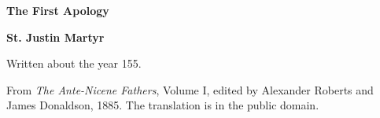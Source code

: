 \documentclass[11pt,letterpaper]{article}
\begin{document}
\color{ink}

\begin{titlepage}
\centering
\vspace*{4em}
{\LARGE\bfseries\color{heading} The First Apology\par}
\vspace{2em}
{\LARGE\bfseries\color{heading} St. Justin Martyr\par}
\vspace{3em}
{Written about the year 155.\par}
\vfill
{\small From \emph{The Ante-Nicene Fathers}, Volume I, edited by Alexander
Roberts and James Donaldson, 1885. The translation is in the public
domain.\par}
\vspace{2em}
\end{titlepage}

\tableofcontents
\clearpage


\end{document}
